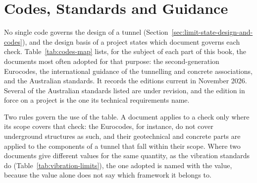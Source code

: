 \chapter{Codes, Standards and Guidance}
\label{app:codes}

No single code governs the design of a tunnel (Section~\ref{sec:limit-state-design-and-codes}),
and the design basis of a project states which document governs each check.
Table~\ref{tab:codes-map} lists, for the subject of each part of this book,
the documents most often adopted for that purpose: the second-generation
Eurocodes, the international guidance of the tunnelling and concrete
associations, and the Australian standards. It records the editions current in
November 2026. Several of the Australian standards listed are under revision,
and the edition in force on a project is the one its technical requirements
name.

Two rules govern the use of the table. A document applies to a check only
where its scope covers that check: the Eurocodes, for instance, do not cover
underground structures as such, and their geotechnical and concrete parts are
applied to the components of a tunnel that fall within their scope. Where
two documents give different values for the same quantity, as the vibration
standards do (Table~\ref{tab:vibration-limits}), the one adopted is named
with the value, because the value alone does not say which framework it
belongs to.

